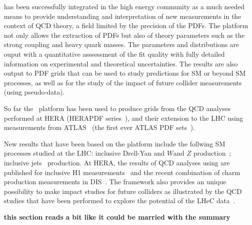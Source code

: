 \fitter has been successfully integrated in the high energy community as a much needed means to provide understanding and interpretation of new measurements in the context of QCD theory, a field limited by the precision of the PDFs.  
The \fitter platform not only allows the extraction of PDFs but also of theory parameters such as the strong coupling and heavy quark masses. The parameters and distributions are ouput with a
quantitative asssessment of the fit quality with fully detailed information on 
experimental and theoretical uncertainties.
The results are also output to PDF grids that can be used to study predictions for SM or beyond SM processes, as well as for the study of the impact of 
future collider measurements (using pseudo-data).


So far the \fitter\ platform has been used to produce grids 
from the QCD analyses performed at 
HERA (HERAPDF series~\cite{h1zeus:2009wt}), and their extension to the LHC 
using 
measurements from ATLAS~\cite{atlas:strange,atlas:jets} (the first ever ATLAS PDF sets~\cite{atlas:grids}).

New results that have been based on the \fitter platform include 
the follwing SM processes 
studied at the LHC:  inclusive Drell-Yan and $W$and $Z$ 
production~\cite{atlas:strange,atlas:hm,cms:strange};
inclusive jets~\cite{atlas:jets,cms:jets} production.
At HERA, the results of QCD analyses using \fitter are 
published for inclusive H1 measurements~\cite{h1:2012kk}
and the recent combination of charm production measurements 
in DIS~\cite{h1zeus:charm}.
The \fitter framework also provides an unique possibility to 
make impact studies for future colliders
as illustrated by the QCD studies that have been performed to 
explore the potential of the LHeC data~\cite{lhec:studies}.

{\bf this section reads a bit like it could be married with the summary}
